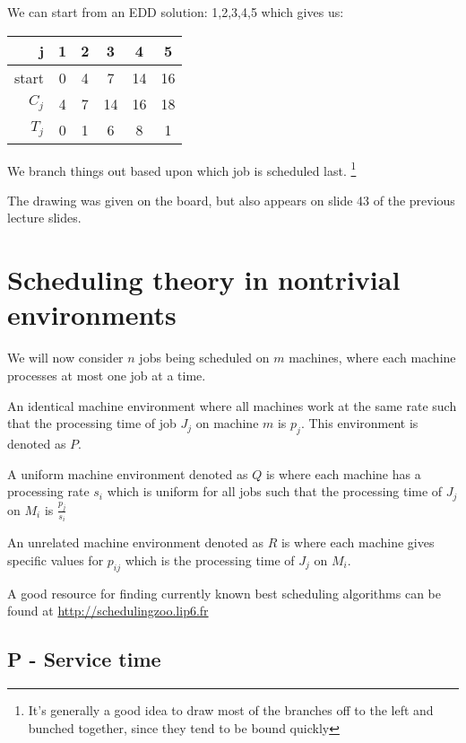 \documentclass{idc_msc}
\begin{document}
We can start from an EDD solution: 1,2,3,4,5 which gives us:

\begin{tabu} to \linewidth{|r|c|c|c|c|c|}
\hline
j & 1 & 2 & 3 & 4 & 5 \\
\hline
start & 0 & 4 & 7 & 14 & 16 \\
\(C_j\) & 4 & 7 & 14 & 16 & 18 \\
\(T_j\) & 0 & 1 & 6 & 8 & 1 \\
\hline
\end{tabu}

We branch things out based upon which job is scheduled last.
\footnote{It's generally a good idea to draw most of the branches off to the left and bunched together, since they tend to be bound quickly}

The drawing was given on the board, but also appears on slide 43 of the previous lecture slides.

%
%
%

\section{Scheduling theory in nontrivial environments}

We will now consider \(n\) jobs being scheduled on \(m\) machines, where each machine processes at most one job at a time.

An identical machine environment where all machines work at the same rate such that the processing time of job \(J_j\) on machine \(m\) is \(p_j\). This environment is denoted as \(P\).

A uniform machine environment denoted as \(Q\) is where each machine has a processing rate \(s_i\) which is uniform for all jobs such that the processing time of \(J_j\) on \(M_i\) is \(\frac{p_j}{s_i}\)

An unrelated machine environment denoted as \(R\) is where each machine gives specific values for \(p_{ij}\) which is the processing time of \(J_j\) on \(M_i\).

A good resource for finding currently known best scheduling algorithms can be found at \href{http://schedulingzoo.lip6.fr}{http://schedulingzoo.lip6.fr}

\subsection{P - Service time}
\end{document}
